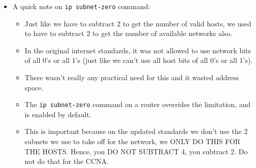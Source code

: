 \begin{itemize}
    \item A quick note on \verb|ip subnet-zero| command:
        \begin{itemize}
            \item Just like we have to subtract 2 to get the number of valid hosts, we used to have to subtract 2 to get the number of available networks also. 
            \item In the original internet standards, it was not allowed to use network bits of all 0's or all 1's (just like we can't use all host bits of all 0's or all 1's).
            \item There wasn't really any practical need for this and it wasted address space.
            \item The \verb|ip subnet-zero| command on a router overrides the limitation, and is enabled by default.
            \item This is important because on the updated standards we don't use the 2 subnets we use to take off for the network, we ONLY DO THIS FOR THE HOSTS. Hence, you DO NOT SUBTRACT 4, you subtract 2. Do not do that for the CCNA.
        \end{itemize}
\end{itemize}


